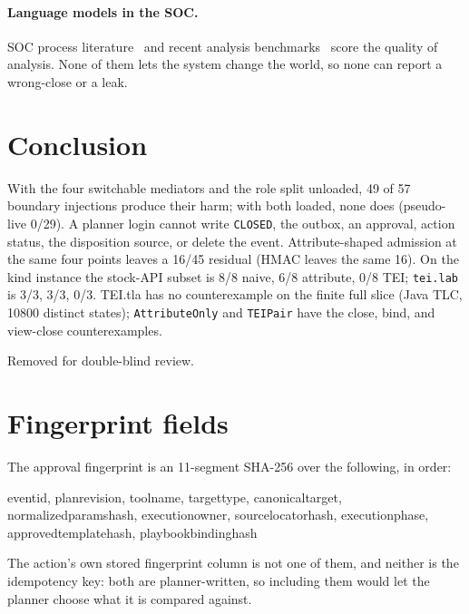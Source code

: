\documentclass[acmsmall,manuscript,review,anonymous]{acmart}
\renewcommand{\_}{\discretionary{\textunderscore}{}{\textunderscore}}
\begin{document}
\paragraph{Language models in the SOC.}
SOC process literature~\cite{kokulu2019matched,goodall2004work,sundaramurthy2016turning}
and recent analysis benchmarks~\cite{wei2025cortex,deason2025cybersoceval,jajodia2026siabench}
score the quality of analysis. None of them lets the system change the
world, so none can report a wrong-close or a leak.

\section{Conclusion}
\label{sec:conc}

With the four switchable mediators and the role
split unloaded, 49 of 57 boundary injections produce their harm; with
both loaded, none does (pseudo-live 0/29). A planner login cannot write
\texttt{CLOSED}, the outbox, an approval, action status, the disposition
source, or delete the event. Attribute-shaped admission at the same four
points leaves a 16/45 residual ({HMAC} leaves the same 16). On the kind
instance the stock-{API} subset is 8/8 naive, 6/8 attribute, 0/8 {TEI};
\texttt{tei.lab} is 3/3, 3/3, 0/3. {TEI.tla} has no counterexample on the
finite full slice (Java {TLC}, 10800 distinct states);
\texttt{AttributeOnly} and \texttt{TEIPair} have the close, bind, and
view-close counterexamples.

\begin{acks}
Removed for double-blind review.
\end{acks}




\appendix
\section{Fingerprint fields}
\label{app:fp}

The approval fingerprint is an 11-segment SHA-256 over the following, in order:

\begin{flushleft}\small\ttfamily
event\_id, plan\_revision, tool\_name, target\_type, canonical\_target,
normalized\_params\_hash, execution\_owner, source\_locator\_hash,
execution\_phase, approved\_template\_hash, playbook\_binding\_hash
\end{flushleft}

\noindent
The action's own stored fingerprint column is not one of them, and neither is the
idempotency key: both are planner-written, so including them would let the
planner choose what it is compared against.
\end{document}
